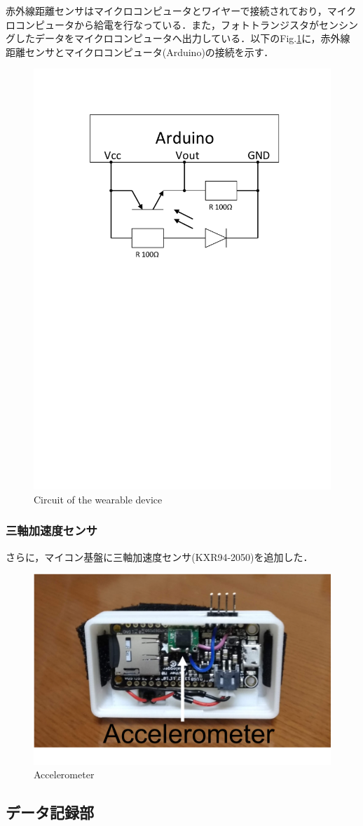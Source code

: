 赤外線距離センサはマイクロコンピュータとワイヤーで接続されており，マイクロコンピュータから給電を行なっている．また，フォトトランジスタがセンシングしたデータをマイクロコンピュータへ出力している．以下のFig.\ref{fig:circuit}に，赤外線距離センサとマイクロコンピュータ(Arduino)の接続を示す．

\begin{figure}[H]
  \centering
  \includegraphics[width=0.5\linewidth]{fig/test}
  \caption{Circuit of the wearable device}
  \label{fig:circuit}
\end{figure}



\subsubsection*{三軸加速度センサ}
さらに，マイコン基盤に三軸加速度センサ(KXR94-2050)を追加した．

\begin{figure}[H]
  \centering
  \includegraphics[width=0.5\linewidth]{fig/accelerometer}
  \caption{Accelerometer}
  \label{fig:accelerometer}
\end{figure}

\subsection*{データ記録部}
